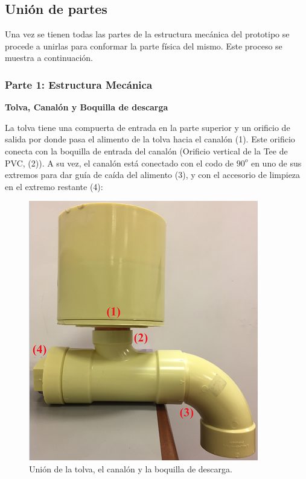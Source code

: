 \subsection{Unión de partes}

Una vez se tienen todas las partes de la estructura mecánica del prototipo se procede a unirlas para conformar la parte física del mismo. Este proceso se muestra a continuación.

\subsubsection{Parte 1: Estructura Mecánica}

\item \textbf{Tolva, Canalón y Boquilla de descarga}

La tolva tiene una compuerta de entrada en la parte superior y un orificio de salida por donde pasa el alimento de la tolva hacia el canalón (1). Este orificio conecta con la boquilla de entrada del canalón (Orificio vertical de la Tee de PVC, (2)). A su vez, el canalón está conectado con el codo de $90^{o}$  en uno de sus extremos para dar guía de caída del alimento (3), y con el accesorio de limpieza en el extremo restante (4):

\begin{figure}[H]
    \begin{center}
    	\includegraphics[scale=0.6]{img/tolcancodo2.png}
    \end{center}
    \caption{Unión de la tolva, el canalón y la boquilla de descarga. \label{tolcancodopng}}
\end{figure}

